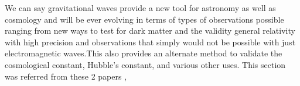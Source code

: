\hspace{1cm}We can say gravitational waves provide a new tool for astronomy as well as cosmology and will be ever evolving in terms of types of observations possible ranging from new ways to test for dark matter and the validity general relativity with high precision and observations that simply would not be possible with just electromagnetic waves.This also provides an alternate method to validate the cosmological constant, Hubble’s constant, and various other uses. This section was referred from these 2 papers \cite{Schutz_1999},\cite{Mukherjee_2020}

\pagebreak
